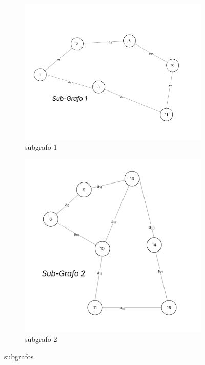 \documentclass[
12pt,
a4paper,
semrecuonosumario,
sumario = abnt-6027-2012]{report}
\begin{document}
\begin{figure}[!htb]
            \begin{subfigure}[b]{0.48\textwidth}
                \centering
                \includegraphics[width=\textwidth]{figuras/subgrafos/subgrafo1.png} %
                \caption{subgrafo 1}
                \label{fig:imagem1}
            \end{subfigure}
            \hfill %
            \begin{subfigure}[b]{0.48\textwidth}
                \centering
                \includegraphics[width=\textwidth]{figuras/subgrafos/subgrafo2.png} %
                \caption{subgrafo 2}
                \label{fig:imagem2}
            \end{subfigure}

            \caption{subgrafos}
            \label{fig:duasFiguras}
        \end{figure}
\end{document}
